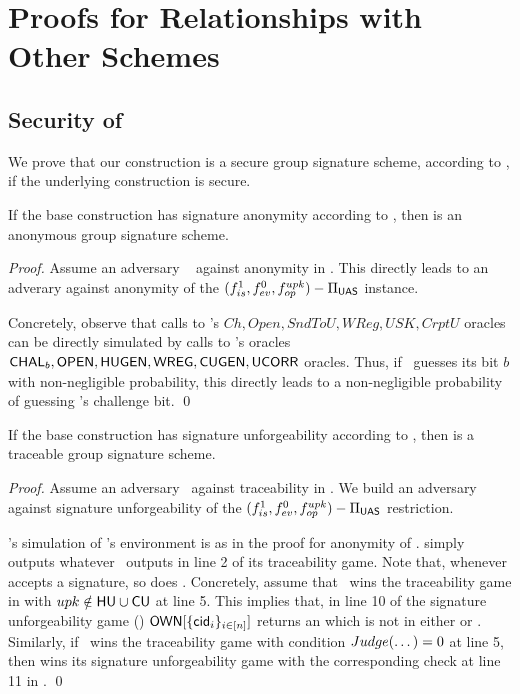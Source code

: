 \section{Proofs for Relationships with Other Schemes}
\label{app:related-proofs}

\subsection{Security of \CUASGS}

We prove that our \CUASGS construction is a secure group signature scheme,
according to \cite{bsz05}, if the underlying \CUASGen construction is secure.

\begin{theorem}
  If the base \CUASGen construction has signature anonymity according to
  , then \CUASGS is an anonymous group
  signature scheme.
\end{theorem}

\begin{proof}
  Assume an adversary \adv~ against anonymity in \CUASGS. This directly leads
  to an adverary \advB against anonymity of the $(f_{is}^1,f_{ev}^0,
  f_{op}^{upk})-\Pi_{\mathsf{UAS}}$ instance.

  Concretely, observe that calls to \adv's $Ch,Open,SndToU,WReg,USK,CrptU$
  oracles can be directly simulated by calls to \advB's oracles $\mathsf{CHAL}_b,
  \mathsf{OPEN},\mathsf{HUGEN},\mathsf{WREG},\mathsf{CUGEN},\mathsf{UCORR}$ oracles. Thus, if \adv~guesses its bit $b$
  with non-negligible probability, this directly leads to a non-negligible
  probability of guessing \advB's challenge bit.
  \qed
\end{proof}

\begin{theorem}
  If the base \CUASGen construction has signature unforgeability according to
  , then \CUASGS is a traceable group signature
  scheme.
\end{theorem}

\begin{proof}
  Assume an adversary \adv~against traceability in \CUASGS. We build an
  adversary \advB against signature unforgeability of the $(f_{is}^1,f_{ev}^0,
  f_{op}^{upk})-\Pi_{\mathsf{UAS}}$ restriction.

  \advB's simulation of \adv's environment is as in the proof for anonymity
  of \CUASGS. \advB simply outputs whatever \adv~outputs in line 2 of its
  traceability game. Note that, whenever \CUASGS accepts a signature, so does
  \CUASGen. Concretely,
  assume that \adv~wins the traceability game in  with
  $upk \notin \mathsf{HU} \cup \mathsf{CU}$ at line 5. This implies that, in line 10 of the
  \UAS signature unforgeability game () $\mathsf{OWN}[\lbrace
  \mathsf{cid}_i\rbrace_{i\in[n]}]$ returns an \uid which is not in either \HU or \CU.
  Similarly, if \adv~wins the traceability game with condition $Judge(\dots)=0$
  at line 5, then \advB wins its signature unforgeability game with the
  corresponding check at line 11 in .
  \qed
\end{proof}

